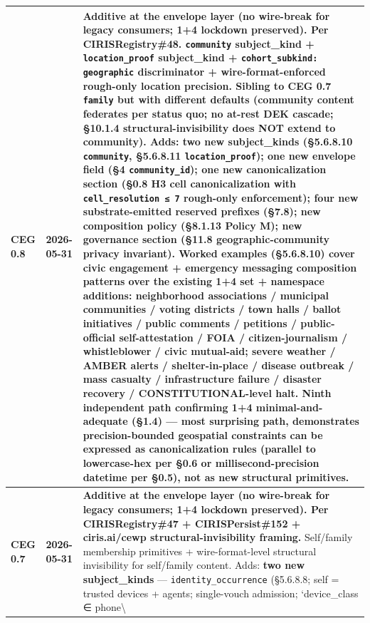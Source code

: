 \documentclass[10pt]{article}
\begin{document}
{\begin{longtable}{|p{5.33cm}|p{5.33cm}|p{5.33cm}|}
\textbf{CEG 0.8} & \textbf{2026-05-31} & \textbf{Additive at the envelope layer (no wire-break for legacy consumers; 1+4 lockdown preserved). Per CIRISRegistry\#48.} \texttt{community} subject\_kind + \texttt{location\_proof} subject\_kind + \texttt{cohort\_subkind: geographic} discriminator + wire-format-enforced rough-only location precision. Sibling to CEG 0.7 \texttt{family} but with different defaults (community content federates per status quo; no at-rest DEK cascade; §10.1.4 structural-invisibility does NOT extend to community). Adds: \textbf{two new subject\_kinds} (§5.6.8.10 \texttt{community}, §5.6.8.11 \texttt{location\_proof}); \textbf{one new envelope field} (§4 \texttt{community\_id}); \textbf{one new canonicalization section} (§0.8 H3 cell canonicalization with \texttt{cell\_resolution ≤ 7} rough-only enforcement); \textbf{four new substrate-emitted reserved prefixes} (§7.8); \textbf{new composition policy} (§8.1.13 Policy M); \textbf{new governance section} (§11.8 geographic-community privacy invariant). Worked examples (§5.6.8.10) cover \textbf{civic engagement + emergency messaging} composition patterns over the existing 1+4 set + namespace additions: neighborhood associations / municipal communities / voting districts / town halls / ballot initiatives / public comments / petitions / public-official self-attestation / FOIA / citizen-journalism / whistleblower / civic mutual-aid; severe weather / AMBER alerts / shelter-in-place / disease outbreak / mass casualty / infrastructure failure / disaster recovery / CONSTITUTIONAL-level halt. Ninth independent path confirming 1+4 minimal-and-adequate (§1.4) — most surprising path, demonstrates precision-bounded geospatial constraints can be expressed as canonicalization rules (parallel to lowercase-hex per §0.6 or millisecond-precision datetime per §0.5), not as new structural primitives. \\ \hline
\textbf{CEG 0.7} & \textbf{2026-05-31} & \textbf{Additive at the envelope layer (no wire-break for legacy consumers; 1+4 lockdown preserved). Per CIRISRegistry\#47 + CIRISPersist\#152 + ciris.ai/cewp structural-invisibility framing.} Self/family membership primitives + wire-format-level structural invisibility for self/family content. Adds: \textbf{two new subject\_kinds} — \texttt{identity\_occurrence} (§5.6.8.8; self = trusted devices + agents; single-vouch admission; `device\_class ∈ phone\textbackslash{} \\ \hline

\end{longtable}}
\end{document}
